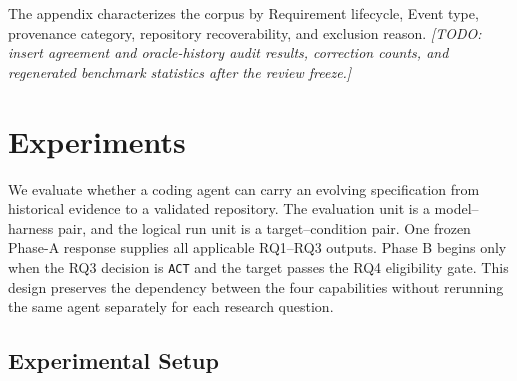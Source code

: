 \documentclass{article} %
\newcommand{\placeholder}[1]{\emph{[#1]}}
\begin{document}
The appendix characterizes the corpus by Requirement lifecycle, Event type, provenance category, repository recoverability, and exclusion reason.
\placeholder{TODO: insert agreement and oracle-history audit results, correction counts, and regenerated benchmark statistics after the review freeze.}
\section{Experiments}
\label{sec:experiments}

We evaluate whether a coding agent can carry an evolving specification from historical evidence to a validated repository. The evaluation unit is a model--harness pair, and the logical run unit is a target--condition pair. One frozen Phase-A response supplies all applicable RQ1--RQ3 outputs. Phase B begins only when the RQ3 decision is \texttt{ACT} and the target passes the RQ4 eligibility gate. This design preserves the dependency between the four capabilities without rerunning the same agent separately for each research question.

\subsection{Experimental Setup}


\end{document}
